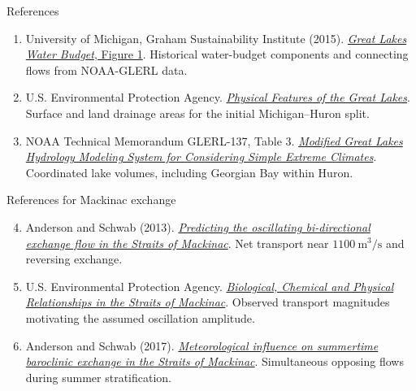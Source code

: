 \documentclass[11pt,aspectratio=169]{beamer}
\begin{document}
\begin{frame}{References}
\begin{enumerate}
\item University of Michigan, Graham Sustainability Institute (2015).\newline
\href{https://graham.umich.edu/media/pubs/GreatLakesWaterBudget.pdf}{\emph{Great Lakes Water Budget}, Figure 1}.\newline
Historical water-budget components and connecting flows from NOAA-GLERL data.
\item U.S. Environmental Protection Agency.\newline
\href{https://www.epa.gov/greatlakes/physical-features-great-lakes}{\emph{Physical Features of the Great Lakes}}.\newline
Surface and land drainage areas for the initial Michigan--Huron split.
\item NOAA Technical Memorandum GLERL-137, Table 3.\newline
\href{https://repository.library.noaa.gov/view/noaa/11063/noaa_11063_DS1.pdf}{\emph{Modified Great Lakes Hydrology Modeling System for Considering Simple Extreme Climates}}.\newline
Coordinated lake volumes, including Georgian Bay within Huron.
\end{enumerate}
\end{frame}

\begin{frame}{References for Mackinac exchange}
\begin{enumerate}
\setcounter{enumi}{3}
\item Anderson and Schwab (2013).\newline
\href{https://doi.org/10.1016/j.jglr.2013.09.001}{\emph{Predicting the oscillating bi-directional exchange flow in the Straits of Mackinac}}.\newline
Net transport near $1100\ \mathrm{m^3/s}$ and reversing exchange.
\item U.S. Environmental Protection Agency.\newline
\href{https://nepis.epa.gov/Exe/ZyPURL.cgi?Dockey=9101AX9F.TXT}{\emph{Biological, Chemical and Physical Relationships in the Straits of Mackinac}}.\newline
Observed transport magnitudes motivating the assumed oscillation amplitude.
\item Anderson and Schwab (2017).\newline
\href{https://doi.org/10.1002/2016JC012255}{\emph{Meteorological influence on summertime baroclinic exchange in the Straits of Mackinac}}.\newline
Simultaneous opposing flows during summer stratification.
\end{enumerate}
\end{frame}
\end{document}
